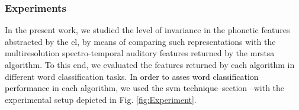 \documentclass[10pt,letterpaper]{article}
\newcommand{\reviewertwo}[1]{\textcolor{black}{#1}}
\begin{document}

















\subsubsection*{Experiments}

In the present work, we studied the level of invariance in the phonetic features abstracted by the \gls{el}, by means of comparing such representations with the multiresolution spectro-temporal auditory features returned by the \gls{mrstsa} algorithm. To this end, we evaluated the features returned by each algorithm in different word classification tasks. \reviewertwo{In order to asses word classification performance} in each algorithm, \reviewertwo{we used the \gls{svm} technique}--section --with  the experimental setup depicted in Fig. \ref{fig:Experiment}.
\end{document}
